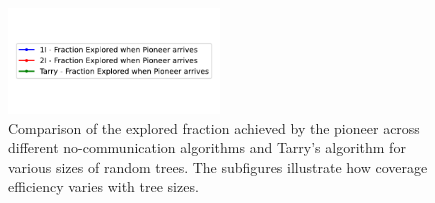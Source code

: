 \begin{figure}[H]
    \centering
    \qquad
    \qquad
    \includegraphics[width=0.5\textwidth]{Cap3/no_comm_fraction_legend.pdf}
    \newline
    \qquad
    \newline
    \qquad
    \caption{Comparison of the explored fraction achieved by the pioneer across different no-communication algorithms and Tarry's algorithm for various sizes of random trees. The subfigures illustrate how coverage efficiency varies with tree sizes.}
    \label{fig_no_comm_fraction_all_sizes_tree}
\end{figure}

